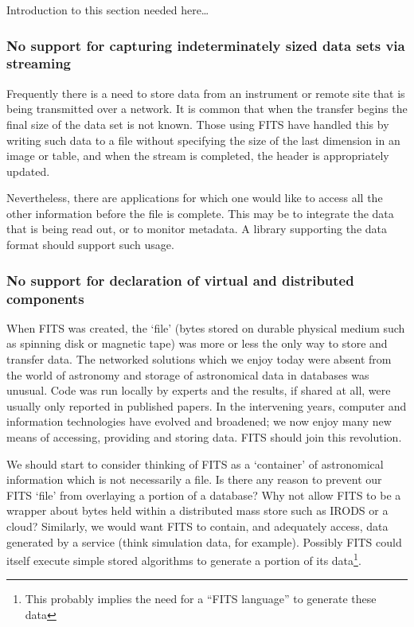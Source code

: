 \documentclass[final,authoryear,5p,times,twocolumn]{elsarticle}
\begin{document}
Introduction to this section needed here…


\subsubsection{No support for capturing indeterminately sized data sets via streaming}


Frequently there is a need to store data from an instrument or remote
site that is being transmitted over a network. It is common that when
the transfer begins the final size of the data set is not known. Those
using FITS have handled this by writing such data to a file without
specifying the size of the last dimension in an image or table, and
when the stream is completed, the header is appropriately updated.


Nevertheless, there are applications for which one would like to
access all the other information before the file is complete. This may
be to integrate the data that is being read out, or to monitor
metadata. A library supporting the data format should support such
usage.


\subsubsection{No support for declaration of virtual and distributed components}


When FITS was created, the `file' (bytes stored on durable physical
medium such as spinning disk or magnetic tape) was more or less the
only way to store and transfer data. The networked solutions which we
enjoy today were absent from the world of astronomy and storage of
astronomical data in databases was unusual. Code was run locally by
experts and the results, if shared at all, were usually only reported
in published papers. In the intervening years, computer and
information technologies have evolved and broadened; we now enjoy many
new means of accessing, providing and storing data. FITS should join
this revolution.


We should start to consider thinking of FITS as a `container' of
astronomical information which is not necessarily a file. Is there
any reason to prevent our FITS `file' from overlaying a portion of a
database? Why not allow FITS to be a wrapper about bytes held within a
distributed mass store such as IRODS or a cloud? Similarly, we would
want FITS to contain, and adequately access, data generated by a
service (think simulation data, for example). Possibly FITS could
itself execute simple stored algorithms to generate a portion of its
data\footnote{This probably implies the need for a ``FITS language'' to generate these data}.
\end{document}
